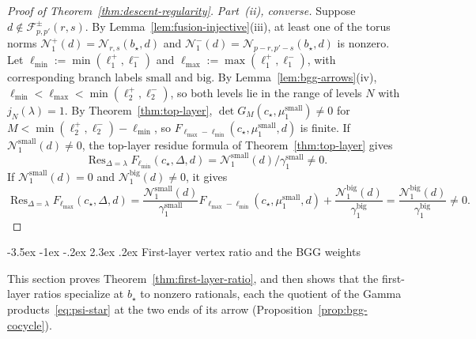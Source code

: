 \documentclass[twoside,10pt]{article}
\makeatletter
\numberwithin{equation}{section}
\theoremstyle{slbody}
\theoremstyle{definition}
\theoremstyle{remark}
\newcommand{\Res}{\operatorname{Res}}
\renewcommand{\section}{%
  \@startsection{section}{1}{\z@}%
    {-3.5ex \@plus -1ex \@minus -.2ex}%
    {2.3ex \@plus .2ex}%
    {\normalfont\large\bfseries}}
\makeatother
\begin{document}
\begin{proof}[Proof of Theorem~\ref{thm:descent-regularity}]
\emph{Part~(ii), converse.}  Suppose \(d\notin\mathcal{F}^\pm_{p,p'}(r,s)\).
By Lemma~\ref{lem:fusion-injective}(iii), at least one of the torus norms
\(\mathcal N^+_1(d)=\mathcal{N}_{r,s}(b_\star,d)\) and
\(\mathcal N^-_1(d)=\mathcal{N}_{p-r,p'-s}(b_\star,d)\) is nonzero.
Let \(\ell_{\min}:=\min(\ell^+_1,\ell^-_1)\) and
\(\ell_{\max}:=\max(\ell^+_1,\ell^-_1)\), with corresponding branch labels
\(\mathrm{small}\) and \(\mathrm{big}\).  By Lemma~\ref{lem:bgg-arrows}(iv),
\(\ell_{\min}<\ell_{\max}<\min(\ell^+_2,\ell^-_2)\), so both levels lie in
the range of levels \(N\) with \(j_N(\lambda)=1\).  By Theorem~\ref{thm:top-layer},
\(\det G_M(c_\star,\mu^{\mathrm{small}}_1)\neq0\) for
\(M<\min(\ell^+_2,\ell^-_2)-\ell_{\min}\), so
\(F_{\ell_{\max}-\ell_{\min}}(c_\star,\mu^{\mathrm{small}}_1,d)\) is finite.
If \(\mathcal N^{\mathrm{small}}_1(d)\neq0\), the top-layer residue formula of
Theorem~\ref{thm:top-layer} gives
\[
 \Res_{\Delta=\lambda}F_{\ell_{\min}}(c_\star,\Delta,d)
 =\mathcal N^{\mathrm{small}}_1(d)/\gamma^{\mathrm{small}}_1\neq0.
\]
If
\(\mathcal N^{\mathrm{small}}_1(d)=0\) and \(\mathcal N^{\mathrm{big}}_1(d)\neq0\), it
gives
\[
 \Res_{\Delta=\lambda}F_{\ell_{\max}}(c_\star,\Delta,d)
 =\frac{\mathcal N^{\mathrm{small}}_1(d)}{\gamma^{\mathrm{small}}_1}
  F_{\ell_{\max}-\ell_{\min}}(c_\star,\mu^{\mathrm{small}}_1,d)
 +\frac{\mathcal N^{\mathrm{big}}_1(d)}{\gamma^{\mathrm{big}}_1}
 =\frac{\mathcal N^{\mathrm{big}}_1(d)}{\gamma^{\mathrm{big}}_1}\neq0.
\]
\end{proof}

\section{First-layer vertex ratio and the BGG weights}\label{sec:cocycle}

This section proves Theorem~\ref{thm:first-layer-ratio}, and then shows that
the first-layer ratios specialize at \(b_\star\) to nonzero rationals, each
the quotient of the Gamma products~\eqref{eq:psi-star} at the two ends of
its arrow (Proposition~\ref{prop:bgg-cocycle}).
\end{document}
